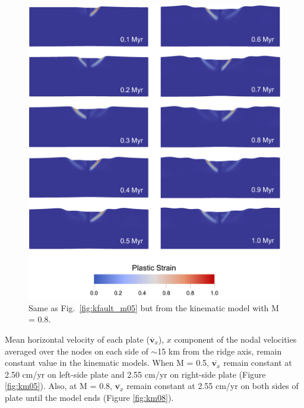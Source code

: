\documentclass[letterpaper,12pt,notitle]{memphisthesis}                     %
\begin{document}
\begin{figure}[!htb]
	\centering
	\includegraphics[width=0.9\linewidth]{./figs/kfault_m08.png}
	\caption{Same as Fig.~\ref{fig:kfault_m05} but from the kinematic model with M = 0.8.}
	\label{fig:kfault_m08}
\end{figure}

Mean horizontal velocity of each plate ($\overline{\boldsymbol{v}}_{x}$), $x$ component of the nodal velocities averaged over the nodes on each side of $\sim$15 km from the ridge axis, remain constant value in the kinematic models.
When M = 0.5, $\overline{\boldsymbol{v}_x}$ remain constant at 2.50 cm/yr on left-side plate and 2.55 cm/yr on right-side plate (Figure \ref{fig:km05}). Also, at M = 0.8, $\overline{\boldsymbol{v}_x}$ remain constant at 2.55 cm/yr on both sides of plate until the model ends (Figure \ref{fig:km08}). 
\end{document}
